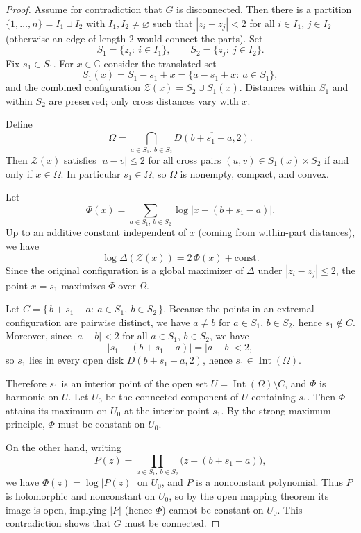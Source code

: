 \documentclass{article}
\theoremstyle{definition}
\let\le\leqslant
\renewcommand*{\emptyset}{\varnothing}
\begin{document}
\begin{proof}
Assume for contradiction that $G$ is disconnected. Then there is a partition
$\{1,\dots,n\}=I_1\sqcup I_2$ with $I_1,I_2\neq\emptyset$ such that
$|z_i-z_j|<2$ for all $i\in I_1$, $j\in I_2$ (otherwise an edge of length $2$
would connect the parts).  Set
\[
S_1=\{z_i:\ i\in I_1\},\qquad S_2=\{z_j:\ j\in I_2\}.
\]
Fix $s_1\in S_1$. For $x\in\mathbb C$ consider the translated set
\[
S_1(x)=S_1-s_1+x=\{a-s_1+x:\ a\in S_1\},
\]and the combined configuration
\(
\mathcal Z(x)=S_2 \cup S_1(x).
\)
Distances within $S_1$ and within $S_2$ are preserved; only cross distances vary with $x$.

Define
\[
\Omega=\bigcap_{a\in S_1,\ b\in S_2}\overline{D(b+s_1-a,2)}.
\]
Then $\mathcal Z(x)$ satisfies $|u-v|\le 2$ for all cross pairs
$(u,v)\in S_1(x)\times S_2$ if and only if $x\in\Omega$.
In particular $s_1\in\Omega$, so $\Omega$ is nonempty, compact, and convex.

Let
\[
\Phi(x)=\sum_{a\in S_1,\ b\in S_2}\log|x-(b+s_1-a)|.
\]
Up to an additive constant independent of $x$ (coming from within-part distances),
we have
\[
\log\Delta(\mathcal Z(x))=2\,\Phi(x)+\mathrm{const}.
\]
Since the original configuration is a global maximizer of $\Delta$ under
$|z_i-z_j|\le 2$, the point $x=s_1$ maximizes $\Phi$ over $\Omega$.

Let $C=\{\,b+s_1-a:\ a\in S_1,\ b\in S_2\,\}$.
Because the points in an extremal configuration are pairwise distinct,
we have $a\neq b$ for $a\in S_1$, $b\in S_2$, hence $s_1\notin C$.
Moreover, since $|a-b|<2$ for all $a\in S_1$, $b\in S_2$, we have
\[
|s_1-(b+s_1-a)|=|a-b|<2,
\]
so $s_1$ lies in every open disk $D(b+s_1-a,2)$, hence
$s_1\in\operatorname{Int}(\Omega)$.

Therefore $s_1$ is an interior point of the open set
$U=\operatorname{Int}(\Omega)\setminus C$, and $\Phi$ is harmonic on $U$.
Let $U_0$ be the connected component of $U$ containing $s_1$.
Then $\Phi$ attains its maximum on $U_0$ at the interior point $s_1$.
By the strong maximum principle, $\Phi$ must be constant on $U_0$.

On the other hand, writing
\[
P(z)=\prod_{a\in S_1,\ b\in S_2}\bigl(z-(b+s_1-a)\bigr),
\]
we have $\Phi(z)=\log|P(z)|$ on $U_0$, and $P$ is a nonconstant polynomial.
Thus $P$ is holomorphic and nonconstant on $U_0$, so by the open mapping theorem
its image is open, implying $|P|$ (hence $\Phi$) cannot be constant on $U_0$.
This contradiction shows that $G$ must be connected.
\end{proof}
\end{document}
